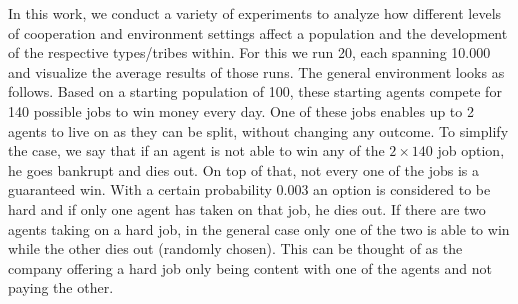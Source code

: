 \documentclass[sigconf]{acmart}
\newcommand{\todo}[1]{{\color{red}{#1}}}
\newcommand{\VNumSimulations}{20\xspace}
\newcommand{\VNumDays}{10.000\xspace}
\newcommand{\VNumPop}{100\xspace}
\newcommand{\VNumTrees}{140\xspace}
\newcommand{\VProbPredator}{0.003\xspace}
\begin{document}

    \todo{relate this to related work/experiments}

    In this work, we conduct a variety of experiments to analyze how different levels of cooperation and environment settings affect a population and the development of the respective types/tribes within.
    For this we run \VNumSimulations, each spanning \VNumDays and visualize the average results of those runs.
    The general environment looks as follows.
    Based on a starting population of \VNumPop, these starting agents compete for \VNumTrees possible jobs to win money every day.
    One of these jobs enables up to 2 agents to live on as they can be split, without changing any outcome.
    To simplify the case, we say that if an agent is not able to win any of the $2 \times \VNumTrees$ job option, he goes bankrupt and dies out.
    On top of that, not every one of the jobs is a guaranteed win.
    With a certain probability \VProbPredator an option is considered to be hard and if only one agent has taken on that job, he dies out.
    If there are two agents taking on a hard job, in the general case only one of the two is able to win while the other dies out (randomly chosen).
    This can be thought of as the company offering a hard job only being content with one of the agents and not paying the other.
\end{document}
